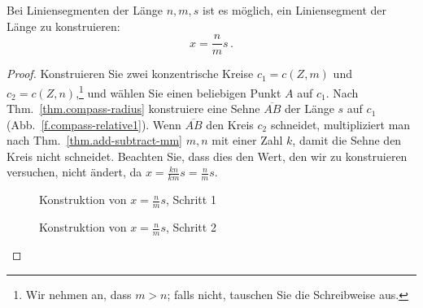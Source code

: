 \begin{theorem}\label{thm.compass-ratio}
Bei Liniensegmenten der Länge $n,m,s$ ist es möglich, ein Liniensegment der Länge zu konstruieren:
\[
x = \frac{n}{m}s\,.
\]
\end{theorem}

\begin{proof}
Konstruieren Sie zwei konzentrische Kreise $c_1 = c(Z,m)$ und $c_2 = c(Z,n)$,\footnote{Wir nehmen an, dass $m>n$; falls nicht, tauschen Sie die Schreibweise aus.} und wählen Sie einen beliebigen Punkt $A$ auf $c_1$. Nach Thm.~\ref{thm.compass-radius} konstruiere eine Sehne $\overline{AB}$ der Länge $s$ auf $c_1$ (Abb.~\ref{f.compass-relative1}). Wenn $\overline{AB}$ den Kreis $c_2$ schneidet, multipliziert man nach Thm.~\ref{thm.add-subtract-mm} $m,n$ mit einer Zahl $k$, damit die Sehne den Kreis nicht schneidet. Beachten Sie, dass dies den Wert, den wir zu konstruieren versuchen, nicht ändert, da $x=\displaystyle\frac{kn}{km}s=\displaystyle\frac{n}{m}s$.

\begin{figure}[b]
\begin{center}
\begin{minipage}{.45\textwidth}
\caption{Konstruktion von $x=\frac{n}{m}s$, Schritt 1}\label{f.compass-relative1}
\end{minipage}
\hfill
\begin{minipage}{.45\textwidth}
\caption{Konstruktion von $x=\frac{n}{m}s$, Schritt 2}\label{f.compass-relative2}
\end{minipage}
\end{center}
\end{figure}


\end{proof}
